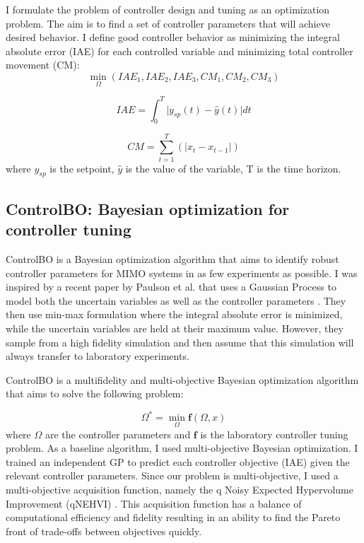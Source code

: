 I formulate the problem of controller design and tuning as an optimization problem. The aim is to find a set of controller parameters that will achieve desired behavior. I define good controller behavior as minimizing the integral absolute error (IAE) for each controlled variable and minimizing total controller movement (CM):
\begin{equation}
    \min_{\Omega}(IAE_1, IAE_2, IAE_3, CM_1, CM_2, CM_3)
\end{equation}


\begin{equation}
    IAE = \int_0^T \vert y_{sp}(t) - \hat y(t) \vert dt
\end{equation}

\begin{equation}
    CM = \sum_{t=1}^{T}( \vert x_t - x_{t-1} \vert)
\end{equation}
where $y_{sp}$ is the setpoint,  $\hat y$  is the value of  the variable, T is the time horizon. 

\subsection{ControlBO: Bayesian optimization for controller tuning}

ControlBO is a Bayesian optimization algorithm that aims to identify robust controller parameters for MIMO systems in as few experiments as possible. I was inspired by a recent paper by Paulson et al. that uses a Gaussian Process to model both the uncertain variables as well as the controller parameters \cite{Paulson2022}. They then use min-max formulation where the integral absolute error is minimized, while the uncertain variables are held at their maximum value. However, they sample from a high fidelity simulation and then assume that this simulation will always transfer to laboratory experiments.

ControlBO is a multifidelity and multi-objective Bayesian optimization algorithm that aims to solve the following problem:

\begin{equation}
    \Omega^* = \min_{\Omega} \mathbf f(\Omega, x)
\end{equation}
where $\Omega$ are the controller parameters and $\mathbf f$ is the laboratory 
controller tuning problem. As a baseline algorithm, I used multi-objective Bayesian optimization. I trained an independent GP to predict each controller objective (IAE) given the relevant controller parameters.  Since our problem is multi-objective, I used a multi-objective acquisition function, namely the q Noisy Expected Hypervolume Improvement (qNEHVI) \cite{Balandat2020}. This acquisition function has a balance of computational efficiency and fidelity resulting in an ability to find the Pareto front of trade-offs between objectives quickly. 

